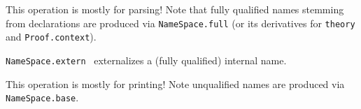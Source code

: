 \begin{isabellebody}
\begin{isamarkuptext}
\begin{description}
  This operation is mostly for parsing!  Note that fully qualified
  names stemming from declarations are produced via \verb|NameSpace.full| (or its derivatives for \verb|theory| and
  \verb|Proof.context|).

  \item \verb|NameSpace.extern|~ externalizes a
  (fully qualified) internal name.

  This operation is mostly for printing!  Note unqualified names are
  produced via \verb|NameSpace.base|.

  \end{description}%
\end{isamarkuptext}%
\isamarkuptrue%
%
\endisatagmlref
{\isafoldmlref}%
%
\isadelimmlref
%
\endisadelimmlref
%
\isadelimtheory
%
\endisadelimtheory
%
\isatagtheory
{}\isamarkupfalse%
%
\endisatagtheory
{\isafoldtheory}%
%
\isadelimtheory
%
\endisadelimtheory
\isanewline
\end{isabellebody}%
